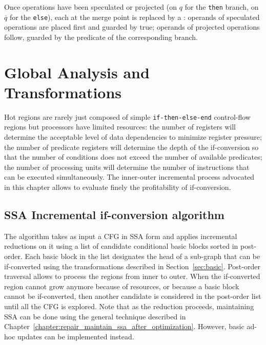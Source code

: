 Once operations have been speculated or projected (on $q$ for the \texttt{then} branch, on $\overline{q}$ for the \texttt{else}), each \phifuns at the merge point is replaced by a \psifun: operands of speculated operations are placed first and guarded by true; operands of projected operations follow, guarded by the predicate of the corresponding branch.

\section{Global Analysis and Transformations}
\label{sec:if_conversion:hyperblock}
Hot regions are rarely just composed of simple \texttt{if-then-else-end} control-flow regions but processors have limited resources: the number of registers will determine the acceptable level of data dependencies to minimize register pressure; the number of predicate registers will determine the depth of the if-conversion so that the number of conditions does not exceed the number of available predicates; the number of processing units will determine the number of instructions that can be executed simultaneously. The inner-outer incremental process advocated in this chapter allows to evaluate finely the profitability of if-conversion. 

\subsection{SSA Incremental if-conversion algorithm}


The algorithm takes as input a CFG in SSA form and applies incremental reductions on it using a list of candidate conditional basic blocks sorted in post-order. 
Each basic block in the list designates the head of a sub-graph that can be if-converted using the transformations described in Section~\ref{sec:basic}. Post-order traversal allows to process the regions from inner to outer. When the if-converted region cannot grow anymore because of resources, or because a basic block cannot be if-converted, then another candidate is considered in the post-order list until all the CFG is explored.
%
%
Note that as the reduction proceeds, maintaining SSA can be done using the general technique described in Chapter~\ref{chapter:repair_maintain_ssa_after_optimization}. However, basic ad-hoc updates can be implemented instead. 

